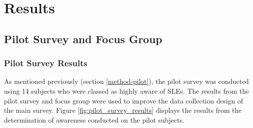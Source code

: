\chapter{Results}

\section{Pilot Survey and Focus Group}

\subsection{Pilot Survey Results} \label{result-pilot-focus}
As mentioned previously (section \ref{method-pilot}), the pilot survey was conducted using 14 subjects who were classed as highly aware of SLEs. The results from the pilot survey and focus group were used to improve the data collection design of the main survey. Figure \ref{fig:pilot_survey_results} displays the results from the determination of awareness conducted on the pilot subjects.
\paragraph{}


